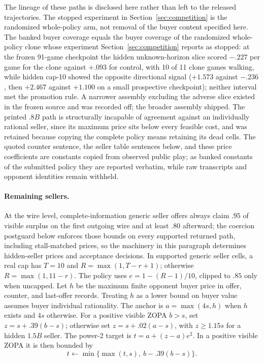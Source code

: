 The lineage of these paths is disclosed here rather than left to the released
trajectories. The stopped experiment in Section~\ref{sec:competition}
is the randomized whole-policy arm, not removal of the buyer content
specified here. The banked buyer coverage equals the buyer coverage of the
randomized whole-policy clone whose experiment Section~\ref{sec:competition}
reports as stopped: at the frozen 91-game checkpoint the hidden
unknown-horizon slice scored $-.227$ per game for the clone against $+.093$
for control, with 10 of 11 clone games walking, while hidden cap-10 showed the
opposite directional signal ($+1.573$ against $-.236$, then $+2.467$ against
$+1.100$ on a small prospective checkpoint); neither interval met the
promotion rule. A narrower assembly excluding the adverse slice existed in the
frozen source and was recorded off; the broader assembly shipped. The printed
$.8B$ path is structurally incapable of agreement against an individually
rational seller, since its maximum price sits below every feasible cost, and
was retained because copying the complete policy means retaining its dead
cells. The quoted counter sentence, the seller table sentences below, and
these price coefficients are constants copied from observed public play; as
banked constants of the submitted policy they are reported verbatim, while
raw transcripts and opponent identities remain withheld.

\paragraph{Remaining sellers.}
At the wire level, complete-information generic seller offers always claim
$.95$ of visible surplus on the first outgoing wire and at least $.80$
afterward; the coercion postguard below enforces those bounds on every
supported returned path, including stall-matched prices, so the machinery in
this paragraph determines hidden-seller prices and acceptance decisions. In
supported generic seller cells, a real cap has $T=10$ and
$R=\max(1,T-r+1)$; otherwise $R=\max(1,11-r)$. The policy uses
$e=1-(R-1)/10$, clipped to $.85$ only when uncapped. Let $h$ be the maximum
finite opponent buyer price in offer, counter, and last-offer records. Treating
$h$ as a lower bound on buyer value assumes buyer individual rationality. The
anchor is $a=\max(4s,h)$ when $h$ exists and $4s$ otherwise. For a positive
visible ZOPA $b>s$, set $z=s+.39(b-s)$; otherwise set $z=s+.02(a-s)$, with
$z\geq1.15s$ for a hidden $1.5B$ seller. The power-2 target is
$t=a+(z-a)e^2$. In a positive visible ZOPA it is then bounded by
\begin{equation}
t\leftarrow\min\{\max(t,s),\ b-.39(b-s)\}.
\label{eq:banked-nego-visible-bound}
\end{equation}

